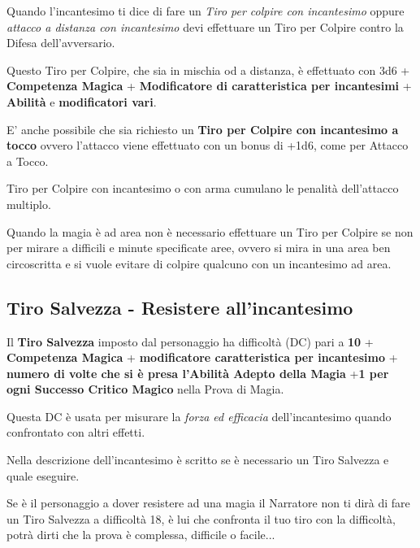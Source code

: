 \begin{multicols}{2}
Quando l'incantesimo ti dice di fare un \emph{Tiro per colpire con incantesimo} oppure \emph{attacco a distanza con incantesimo} devi effettuare un Tiro per Colpire contro la Difesa dell'avversario.

Questo Tiro per Colpire, che sia in mischia od a distanza, è effettuato con 3d6 + \textbf{Competenza Magica} + \textbf{Modificatore di caratteristica per incantesimi} + \textbf{Abilità} e \textbf{modificatori vari}.

E' anche possibile che sia richiesto un \textbf{Tiro per Colpire con incantesimo a tocco} ovvero l'attacco viene effettuato con un bonus di +1d6, come per Attacco a Tocco.

Tiro per Colpire con incantesimo o con arma cumulano le penalità dell'attacco multiplo.

\medskip

Quando la magia è ad area non è necessario effettuare un Tiro per Colpire se non per mirare a difficili e minute specificate aree, ovvero si mira in una area ben circoscritta e si vuole evitare di colpire qualcuno con un incantesimo ad area.

\subsection{Tiro Salvezza - Resistere all'incantesimo}\label{magietirosalvezza}\hypertarget{magietirosalvezza}{}

Il \textbf{Tiro Salvezza} imposto dal personaggio ha difficoltà (DC) pari a \textbf{10} + \textbf{Competenza Magica} + \textbf{modificatore caratteristica per incantesimo} + \textbf{numero di volte che si è presa l'Abilità Adepto della Magia} +\textbf{1 per ogni Successo Critico Magico} nella Prova di Magia.

Questa DC è usata per misurare la \emph{forza ed efficacia} dell'incantesimo quando confrontato con altri effetti.

Nella descrizione dell'incantesimo è scritto se è necessario un Tiro Salvezza e quale eseguire.

Se è il personaggio a dover resistere ad una magia il Narratore non ti dirà di fare un Tiro Salvezza a difficoltà 18, è lui che confronta il tuo tiro con la difficoltà, potrà dirti che la prova è complessa, difficile o facile...

\begin{itemize}[leftmargin=*] \setlength{\itemsep}{0pt}


\end{itemize}
\end{multicols}
